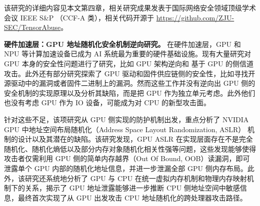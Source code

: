 该研究的详细内容见本文第四章，相关研究成果发表于国际网络安全领域顶级学术会议 IEEE S\&P （CCF-A 类），相关代码开源于 \url{https://github.com/ZJU-SEC/TensorAbuse}。

\textbf{硬件加速层：GPU 地址随机化安全机制逆向研究。}
在硬件加速层，GPU 和 NPU 等计算加速设备已成为 AI 系统最为重要的硬件基础设施。现有大量研究对 GPU 本身的安全性问题进行了研究，比如 GPU 架构逆向和 基于 GPU 的侧信道攻击。此外还有部分研究探索了 GPU 驱动和固件供应链侧的安全性，比如寻找开源驱动中的漏洞或者固件二进制上的漏洞。然而这些工作并没有逆向出 GPU 侧的安全机制的实现原理以及分析其缺陷，而是把 GPU 作为独立单元考虑。此外他们也没有考虑 GPU 作为 IO 设备，可能成为对 CPU 的新型攻击面。

针对这些不足，该项研究从 GPU 侧实现的防护机制出发，重点分析了 NVIDIA GPU 中地址空间布局随机化（Address Space Layout Randomization, ASLR） 机制的设计以及其潜在的缺陷。该研究发现，GPU ASLR 在实现层面存在不是完全随机化、随机化熵低以及部分内存对象随机化相关性强等问题，这些发现能够使得攻击者仅需利用 GPU 侧的简单内存越界（Out Of Bound, OOB）读漏洞，即可泄露单个 GPU 内部的随机化地址信息，并进一步泄漏全部 GPU 侧内存布局。此外，该研究还系统地分析了 GPU 与 CPU 在统一虚拟内存机制和物理内存映射机制下的关系，揭示了 GPU 地址泄露能够进一步推断 CPU 侧地址空间中敏感信息，最终首次实现了从 GPU 出发攻击 CPU 地址随机化的跨处理器攻击路径。

